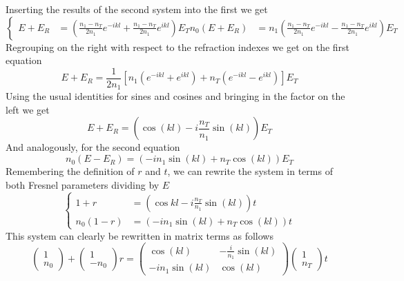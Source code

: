 \documentclass[../electromagnetism.tex]{subfiles}
\begin{document}
Inserting the results of the second system into the first we get
\begin{equation*}
	\left\{ \begin{aligned}
			E+E_R&= \left( \frac{n_1-n_T}{2n_1}e^{-ikl}+\frac{n_1-n_T}{2n_1}e^{ikl} \right)E_T
			n_0\left( E+E_R \right)&= n_1\left( \frac{n_1-n_T}{2n_1}e^{-ikl}-\frac{n_1-n_T}{2n_1}e^{ikl} \right)E_T
	\end{aligned}\right.
\end{equation*}
Regrouping on the right with respect to the refraction indexes we get on the first equation
\begin{equation*}
	E+E_R=\frac{1}{2n_1}\left[ n_1\left( e^{-ikl}+e^{ikl} \right)+n_T\left( e^{-ikl}-e^{ikl} \right) \right]E_T
\end{equation*}
Using the usual identities for sines and cosines and bringing in the factor on the left we get
\begin{equation*}
	E+E_R=\left( \cos(kl)-i\frac{n_T}{n_1}\sin(kl) \right)E_T
\end{equation*}
And analogously, for the second equation
\begin{equation*}
	n_0\left( E-E_R \right)=\left( -in_1\sin(kl)+n_T\cos(kl) \right)E_T
\end{equation*}
Remembering the definition of $r$ and $t$, we can rewrite the system in terms of both Fresnel parameters dividing by $E$
\begin{equation}
	\left\{ \begin{aligned}
			1+r&= \left( \cos{kl}-i\frac{n_T}{n_1}\sin(kl) \right)t\\
			n_0\left( 1-r \right)&= \left( -in_1\sin(kl)+n_T\cos(kl) \right)t
	\end{aligned}\right.
	\label{eq:trsystem.mlt}
\end{equation}
This system can clearly be rewritten in matrix terms as follows
\begin{equation}
	\begin{pmatrix}
		1\\n_0
	\end{pmatrix}+\begin{pmatrix}
		1\\-n_0
	\end{pmatrix}r=\begin{pmatrix}
		\cos(kl)&-\frac{i}{n_1}\sin(kl)\\
		-in_1\sin(kl)&\cos(kl)
	\end{pmatrix}\begin{pmatrix}
		1\\n_T
	\end{pmatrix}t
	\label{eq:transfermatrix.mlt}
\end{equation}
\end{document}
